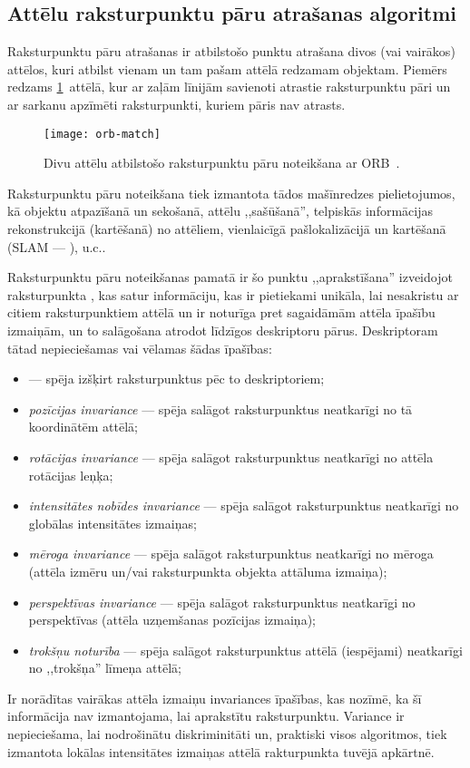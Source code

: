 \subsection{Attēlu raksturpunktu pāru atrašanas algoritmi} \label{sec:matching}
Raksturpunktu pāru atrašanas ir atbilstošo punktu atrašana divos
(vai vairākos) attēlos, kuri atbilst vienam un tam pašam attēlā redzamam
objektam. Piemērs redzams \ref{fig:orb}~attēlā, kur ar zaļām līnijām
savienoti atrastie raksturpunktu pāri un ar sarkanu apzīmēti raksturpunkti,
kuriem pāris nav atrasts.

\begin{figure}[tbh]
	\centering
	\texttt{[image: orb-match]}
	\caption{Divu attēlu atbilstošo raksturpunktu pāru noteikšana ar ORB~\cite{ORB}.}
	\label{fig:orb}
\end{figure}

Raksturpunktu pāru noteikšana tiek izmantota tādos mašīnredzes pielietojumos, kā
objektu atpazīšanā un sekošanā, attēlu ,,sašūšanā'', 
telpiskās informācijas rekonstrukcijā (kartēšanā) no attēliem,
vienlaicīgā pašlokalizācijā un kartēšanā
(SLAM --- ), u.c..

Raksturpunktu pāru noteikšanas pamatā ir šo punktu ,,aprakstīšana'' izveidojot
raksturpunkta , kas satur informāciju,
kas ir pietiekami unikāla, lai nesakristu ar citiem raksturpunktiem attēlā
un ir noturīga pret sagaidāmām attēla īpašību izmaiņām, un to salāgošana
atrodot līdzīgos deskriptoru pārus.
Deskriptoram tātad nepieciešamas vai vēlamas šādas īpašības:
\begin{itemize}
	\item {} --- spēja izšķirt raksturpunktus
		pēc to deskriptoriem;
	\item \emph{pozīcijas invariance} --- spēja salāgot raksturpunktus
		neatkarīgi no tā koordinātēm attēlā;
	\item \emph{rotācijas invariance} --- spēja salāgot raksturpunktus
		neatkarīgi no attēla rotācijas leņķa;
	\item \emph{intensitātes nobīdes invariance} --- spēja salāgot raksturpunktus
		neatkarīgi no globālas intensitātes izmaiņas;
	\item \emph{mēroga invariance} --- spēja salāgot raksturpunktus
		neatkarīgi no mēroga (attēla izmēru un/vai raksturpunkta objekta attāluma izmaiņa);
	\item \emph{perspektīvas invariance} --- spēja salāgot raksturpunktus
		neatkarīgi no perspektīvas (attēla uzņemšanas pozīcijas izmaiņa);
	\item \emph{trokšņu noturība} --- spēja salāgot raksturpunktus
		attēlā (iespējami) neatkarīgi no ,,trokšņa'' līmeņa attēlā;
\end{itemize}
Ir norādītas vairākas attēla izmaiņu invariances īpašības,
kas nozīmē, ka šī informācija nav izmantojama,
lai aprakstītu raksturpunktu.
Variance ir nepieciešama, lai nodrošinātu diskriminitāti un, praktiski visos
algoritmos, tiek izmantota lokālas intensitātes izmaiņas attēlā 
rakturpunkta tuvējā apkārtnē.

